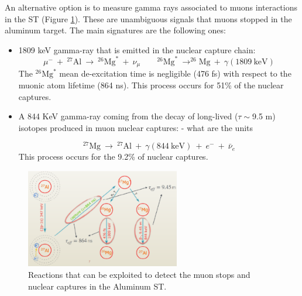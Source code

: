     An alternative option is to measure gamma rays associated 
    to muons interactions in the ST (Figure \ref{fig:stmprocess}).
    These are unambiguous signals that muons stopped in the aluminum target. 
    The main signatures are the following ones: 
    \begin{itemize}
    \item 1809 keV gamma-ray that is emitted in the nuclear capture chain:
    \begin{equation}
        \mu^- \ + \ ^{27}\text{Al} \ \rightarrow \ ^{26}\text{Mg}^* \ + \ \nu_\mu \quad \quad ^{26}\text{Mg}^* \ \rightarrow ^{26}\text{Mg} \ + \ \gamma(1809 \ \text{keV})
     \end{equation}
     The $^{26}\text{Mg}^*$ mean de-excitation time is negligible (476 fs) with 
     respect to the muonic atom lifetime (864 ns). 
     This process occurs for 51\% of the nuclear captures.
     \item  A 844 KeV gamma-ray coming from the decay of 
       long-lived {\red ($\tau \sim$9.5 m)} isotopes produced in muon nuclear captures:
 - what are the units
       
     \begin{equation}
        ^{27}\text{Mg} \ \rightarrow \ ^{27}\text{Al} \ + \ \gamma(844 \ \text{keV}) \ + \ e^- \ + \ \bar{\nu}_e
     \end{equation}
     This process occurs for the 9.2\% of nuclear captures.
\end{itemize}

\begin{figure}[!h]
    \centering
    \includegraphics[width =0.6\textwidth]{figures/png/Screenshot_20240706_094517.png}
    \caption[The muon stops 
    and nuclear captures detection in Al ST.]{Reactions that can be exploited to detect the muon stops 
    and nuclear captures in the Aluminum ST.}
    \label{fig:stmprocess}
    \end{figure}

